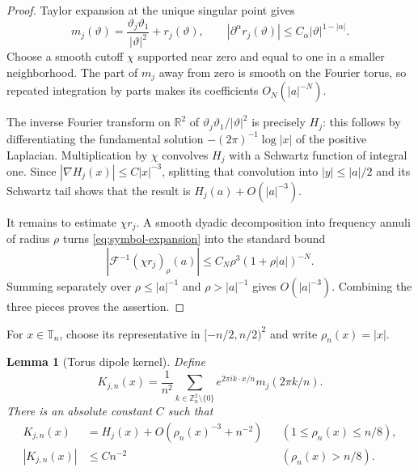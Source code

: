 \documentclass[11pt]{article}
\newtheorem{lemma}[theorem]{Lemma}
\newcommand{\T}{\mathbb T}
\newcommand{\Z}{\mathbb Z}
\begin{document}
\begin{proof}
Taylor expansion at the unique singular point gives
\begin{equation}\label{eq:symbol-expansion}
 m_j(\vartheta)=\frac{\vartheta_j\vartheta_1}{|\vartheta|^2}
 +r_j(\vartheta),\qquad
 |\partial^\alpha r_j(\vartheta)|\le C_\alpha
 |\vartheta|^{1-|\alpha|}.
\end{equation}
Choose a smooth cutoff $\chi$ supported near zero and equal to one in a
smaller neighborhood.  The part of $m_j$ away from zero is smooth on the
Fourier torus, so repeated integration by parts makes its coefficients
$O_N(|a|^{-N})$.

The inverse Fourier transform on $\mathbb R^2$ of
$\vartheta_j\vartheta_1/|\vartheta|^2$ is precisely $H_j$: this follows by
differentiating the fundamental solution
$-(2\pi)^{-1}\log|x|$ of the positive Laplacian.  Multiplication by $\chi$
convolves $H_j$ with a Schwartz function of integral one.  Since
$|\nabla H_j(x)|\le C|x|^{-3}$, splitting that convolution into
$|y|\le|a|/2$ and its Schwartz tail shows that the result is
$H_j(a)+O(|a|^{-3})$.

It remains to estimate $\chi r_j$.  A smooth dyadic decomposition into
frequency annuli of radius $\rho$ turns \eqref{eq:symbol-expansion} into
the standard bound
\[
 |\mathcal F^{-1}(\chi r_j)_\rho(a)|
 \le C_N\rho^3(1+\rho|a|)^{-N}.
\]
Summing separately over $\rho\le |a|^{-1}$ and
$\rho>|a|^{-1}$ gives $O(|a|^{-3})$.  Combining the three pieces proves
the assertion.
\end{proof}

For $x\in\T_n$, choose its representative in
$[-n/2,n/2)^2$ and write $\rho_n(x)=|x|$.

\begin{lemma}[Torus dipole kernel]\label{lem:torus}
Define
\begin{equation}\label{eq:Kn}
 K_{j,n}(x)=\frac1{n^2}\sum_{k\in\Z_n^2\setminus\{0\}}
 e^{2\pi i k\cdot x/n}m_j(2\pi k/n).
\end{equation}
There is an absolute constant $C$ such that
\begin{align}
 K_{j,n}(x)&=H_j(x)+O(\rho_n(x)^{-3}+n^{-2})
 &&(1\le\rho_n(x)\le n/8),\label{eq:local}\\
 |K_{j,n}(x)|&\le Cn^{-2}
 &&(\rho_n(x)>n/8).\label{eq:far}
\end{align}
\end{lemma}
\end{document}

